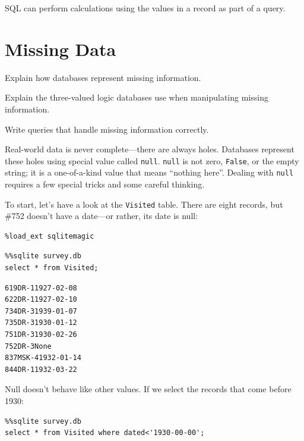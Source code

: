 \documentclass{book}
\begin{document}
\begin{keypoints}
\begin{swcitemize}
\item
  SQL can perform calculations using the values in a record as part of a
  query.
\end{swcitemize}
\end{keypoints}

\section{Missing Data}

\begin{objectives}
\begin{swcitemize}
\item
  Explain how databases represent missing information.
\item
  Explain the three-valued logic databases use when manipulating missing
  information.
\item
  Write queries that handle missing information correctly.
\end{swcitemize}
\end{objectives}

Real-world data is never complete---there are always holes. Databases
represent these holes using special value called \texttt{null}.
\texttt{null} is not zero, \texttt{False}, or the empty string; it is a
one-of-a-kind value that means ``nothing here''. Dealing with
\texttt{null} requires a few special tricks and some careful thinking.

To start, let's have a look at the \texttt{Visited} table. There are
eight records, but \#752 doesn't have a date---or rather, its date is
null:

\begin{verbatim}
%load_ext sqlitemagic
\end{verbatim}

\begin{verbatim}
%%sqlite survey.db
select * from Visited;
\end{verbatim}

\begin{verbatim}
619DR-11927-02-08
622DR-11927-02-10
734DR-31939-01-07
735DR-31930-01-12
751DR-31930-02-26
752DR-3None
837MSK-41932-01-14
844DR-11932-03-22
\end{verbatim}

Null doesn't behave like other values. If we select the records that
come before 1930:

\begin{verbatim}
%%sqlite survey.db
select * from Visited where dated<'1930-00-00';
\end{verbatim}
\end{document}
